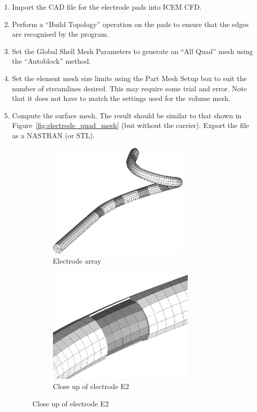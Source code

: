 \begin{appendices}
\begin{enumerate}
    \item Import the CAD file for the electrode pads into ICEM CFD.
    \item Perform a ``Build Topology'' operation on the pads to ensure that the
    edges are recognised by the program.
    \item Set the Global Shell Mesh Parameters to generate an ``All Quad'' mesh
    using the ``Autoblock'' method.
    \item Set the element mesh size limits using the Part Mesh Setup box to
    suit the number of streamlines desired. This may require some trial and
    error. Note that it does not have to match the settings used for the
    volume mesh.
    \item Compute the surface mesh. The result should be similar to that
    shown in Figure~\ref{fig:electrode_quad_mesh} (but without the carrier).
    Export the file as a NASTRAN (or STL).
    
    \begin{figure}
	    \centering
	    \begin{subfigure}[t]{0.5\textwidth}
	        \centering
	        \includegraphics[height=5.5cm]{Appendix/array_autoblock}
	        \caption{Electrode array}
	        \label{fig:array_quad}
	    \end{subfigure}%
		\hfill%
		\begin{subfigure}[t]{0.5\textwidth}
	        \centering
	        \includegraphics[height=5.5cm]{Appendix/array_autoblock_zoom}
	        \caption{Close up of electrode E2}
	        \label{fig:array_quad_zoom}
	    \end{subfigure}%
	    

\end{figure}
\end{enumerate}
\end{appendices}
